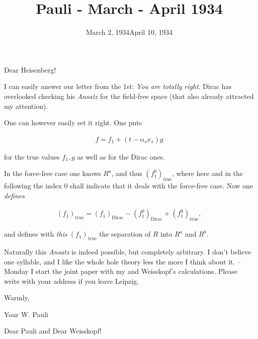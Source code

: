 \documentclass{article}
\title{Pauli - March - April 1934}
\newcommand{\uequ}[1]{
\begin{align*}
#1
\end{align*}
}
\begin{document}
\date{March 2, 1934}

Dear Heisenberg!

I can easily answer our letter from the 1st: \textit{You are totally right}. Dirac has overlooked checking his \textit{Ansatz} for the field-free space (that also already attracted my attention).

One can however easily set it right. One puts
\uequ{
f=f_1 +(t-\alpha_s x_s)g
}
for the true values $f_1,g$ as well as for the Dirac ones.

In the force-free case one knows $R^a$, and thus $(f^0_1)_\text{true}$, where here and in the following the index $0$ shall indicate that it deals with the force-free case. Now one \textit{defines}
\uequ{
(f_1)_\text{true} = (f_1)_\text{Dirac} - (f^0_1)_\text{Dirac} + (f^0_1)_\text{true},
}
and defines with \textit{this} $(f_1)_\text{true}$ the separation of $R$ into $R^a$ and $R^b$.

Naturally this \textit{Ansatz} is indeed possible, but completely arbitrary. I don't believe one syllable, and I like the whole hole theory less the more I think about it. -- Monday I start the joint paper with my and Weisskopf's calculations. Please write with your address if you leave Leipzig.

Warmly,

Your W. Pauli

\date{April 10, 1934}

Dear Pauli and Dear Weisskopf!
\end{document}
